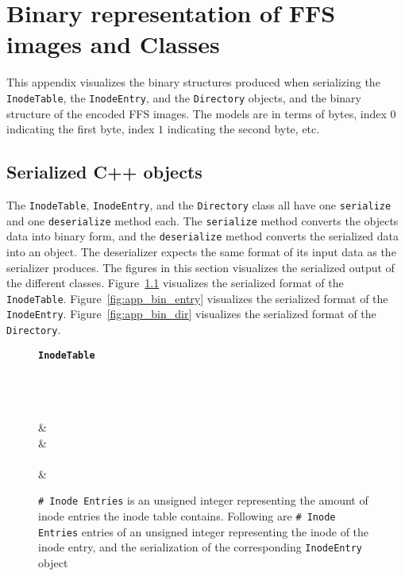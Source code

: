 \renewcommand{\chaptermark}[1]{\markboth{Appendix \thechapter\relax:\thinspace\relax#1}{}}
\chapter{Binary representation of FFS images and Classes}
\label{app:binary_rep}
This appendix visualizes the binary structures produced when serializing the \texttt{InodeTable}, the \texttt{InodeEntry}, and the \texttt{Directory} objects, and the binary structure of the encoded FFS images. The models are in terms of bytes, index $0$ indicating the first byte, index $1$ indicating the second byte, etc.

\section{Serialized C++ objects}
The \texttt{InodeTable}, \texttt{InodeEntry}, and the \texttt{Directory} class all have one \texttt{serialize} and one \texttt{deserialize} method each. The \texttt{serialize} method converts the objects data into binary form, and the \texttt{deserialize} method converts the serialized data into an object. The deserializer expects the same format of its input data as the serializer produces. The figures in this section visualizes the serialized output of the different classes. Figure~\ref{fig:app_bin_table} visualizes the serialized format of the \texttt{InodeTable}. Figure~\ref{fig:app_bin_entry} visualizes the serialized format of the \texttt{InodeEntry}. Figure~\ref{fig:app_bin_dir} visualizes the serialized format of the \texttt{Directory}. 
	
\begin{figure}[!htb]
	\label{fig:app_bin_table}
	\centering
    \textbf{\texttt{InodeTable}}\par\medskip

	\begin{bytefield}[bitwidth=0.0625\textwidth]{16}
		 \\
		\\
		 \\
		 &  \\
		 &  \\
		 \\[1ex]
		 &  \\
	\end{bytefield}
	\caption[Byte representation of the serialization of a \texttt{InodeTable} object]{\texttt{\#~Inode Entries} is an unsigned integer representing the amount of inode entries the inode table contains. Following are \texttt{\#~Inode Entries} entries of an unsigned integer representing the inode of the inode entry, and the serialization of the corresponding \texttt{InodeEntry} object}
\end{figure}

